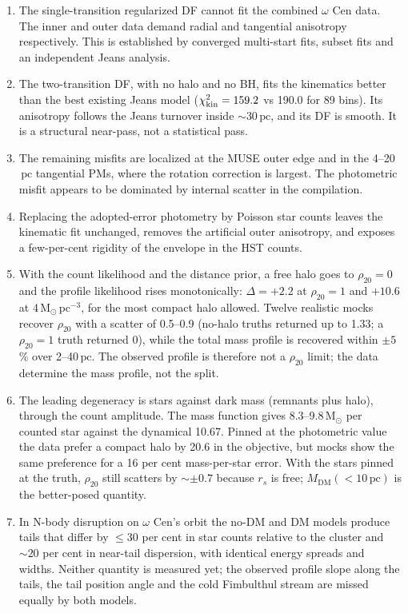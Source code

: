 \documentclass[11pt,a4paper]{article}
\newcommand{\Msun}{\ensuremath{\mathrm{M}_\odot}\xspace}
\newcommand{\pc}{\ensuremath{\,\mathrm{pc}}\xspace}
\newcommand{\dm}{\mathrm{DM}}
\newcommand{\chikin}{\ensuremath{\chi^2_{\rm kin}}\xspace}
\begin{document}
\begin{enumerate}
\item The single-transition regularized DF cannot fit the combined $\omega$
  Cen data. The inner and outer data demand radial and tangential anisotropy
  respectively. This is established by converged multi-start fits, subset
  fits and an independent Jeans analysis.
\item The two-transition DF, with no halo and no BH, fits the kinematics
  better than the best existing Jeans model ($\chikin=159.2$ vs 190.0 for
  89 bins). Its anisotropy follows the Jeans turnover inside $\sim30\pc$, and
  its DF is smooth. It is a structural near-pass, not a statistical pass.
\item The remaining misfits are localized at the MUSE outer edge and in the
  4--20\pc tangential PMs, where the rotation correction is largest. The
  photometric misfit appears to be dominated by internal scatter in the
  compilation.
\item Replacing the adopted-error photometry by Poisson star counts leaves
  the kinematic fit unchanged, removes the artificial outer anisotropy, and
  exposes a few-per-cent rigidity of the envelope in the HST counts.
\item With the count likelihood and the distance prior, a free halo goes to
  $\rho_{20}=0$ and the profile likelihood rises monotonically:
  $\Delta=+2.2$ at $\rho_{20}=1$ and $+10.6$ at 4\,$\Msun\pc^{-3}$, for the
  most compact halo allowed. Twelve realistic mocks recover $\rho_{20}$ with
  a scatter of 0.5--0.9 (no-halo truths returned up to 1.33; a $\rho_{20}=1$
  truth returned 0), while the total mass profile is recovered within
  $\pm5$\% over 2--40\pc. The observed profile is therefore not a
  $\rho_{20}$ limit; the data determine the mass profile, not the split.
\item The leading degeneracy is stars against dark mass (remnants plus
  halo), through the count amplitude. The mass function gives 8.3--9.8\,\Msun
  per counted star against the dynamical 10.67. Pinned at the photometric
  value the data prefer a compact halo by 20.6 in the objective, but mocks
  show the same preference for a 16 per cent mass-per-star error. With the
  stars pinned at the truth, $\rho_{20}$ still scatters by $\sim\pm0.7$
  because $r_s$ is free; $M_\dm(<10\pc)$ is the better-posed quantity.
\item In N-body disruption on $\omega$ Cen's orbit the no-DM and DM models
  produce tails that differ by $\le30$ per cent in star counts relative to
  the cluster and $\sim20$ per cent in near-tail dispersion, with identical
  energy spreads and widths. Neither quantity is measured yet; the observed
  profile slope along the tails, the tail position angle and the cold
  Fimbulthul stream are missed equally by both models.
\end{enumerate}
\end{document}
